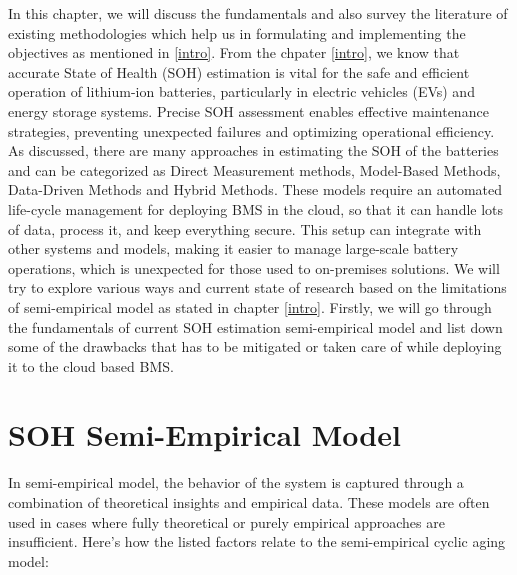 In this chapter, we will discuss the fundamentals and also survey the literature of existing methodologies which help us in formulating and implementing the objectives as mentioned in \ref{intro}. From the chpater \ref{intro}, we know that accurate State of Health (SOH) estimation is vital for the safe and efficient operation of lithium-ion batteries, particularly in electric vehicles (EVs) and energy storage systems. Precise SOH assessment enables effective maintenance strategies, preventing unexpected failures and optimizing operational efficiency. As discussed, there are many approaches in estimating the SOH of the batteries and can be categorized as Direct Measurement methods, Model-Based Methods, Data-Driven Methods and Hybrid Methods. These models require an automated life-cycle management for deploying BMS in the cloud, so that it can handle lots of data, process it, and keep everything secure. This setup can integrate with other systems and models, making it easier to manage large-scale battery operations, which is unexpected for those used to on-premises solutions. We will try to explore various ways and current state of research based on the limitations of semi-empirical model as stated in chapter \ref{intro}. Firstly, we will go through the fundamentals of current SOH estimation semi-empirical model and list down some of the drawbacks that has to be mitigated or taken care of while deploying it to the cloud based BMS. 

\section{SOH Semi-Empirical Model}
In semi-empirical model, the behavior of the system is captured through a combination of theoretical insights and empirical data. These models are often used in cases where fully theoretical or purely empirical approaches are insufficient. Here’s how the listed factors relate to the semi-empirical cyclic aging model:

